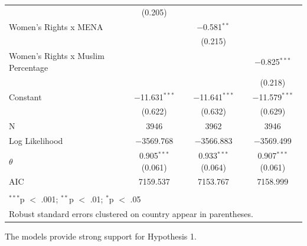 \documentclass[11pt, oneside]{article}
\begin{document}
\begin{table}[!htbp]
\begin{tabular}{@{\extracolsep{5pt}}lccc}
  & (0.205) &  &  \\ 
  Women's Rights x MENA &  & $-$0.581$^{**}$ &  \\ 
  &  & (0.215) &  \\ 
  Women's Rights x Muslim Percentage &  &  & $-$0.825$^{***}$ \\ 
  &  &  & (0.218) \\ 
  Constant & $-$11.631$^{***}$ & $-$11.641$^{***}$ & $-$11.579$^{***}$ \\ 
  & (0.622) & (0.632) & (0.629) \\ 
 N & 3946 & 3962 & 3946 \\ 
Log Likelihood & $-$3569.768 & $-$3566.883 & $-$3569.499 \\ 
$\theta$ & 0.905$^{***}$  (0.061) & 0.933$^{***}$  (0.064) & 0.907$^{***}$  (0.061) \\ 
AIC & 7159.537 & 7153.767 & 7158.999 \\ 
\hline \\[-1.8ex] 
\multicolumn{4}{l}{$^{***}$p $<$ .001; $^{**}$p $<$ .01; $^{*}$p $<$ .05} \\ 
\multicolumn{4}{l}{Robust standard errors clustered on country appear in parentheses.} \\ 
\end{tabular} 
\end{table} 

The models provide strong support for Hypothesis 1. 
\end{document}
